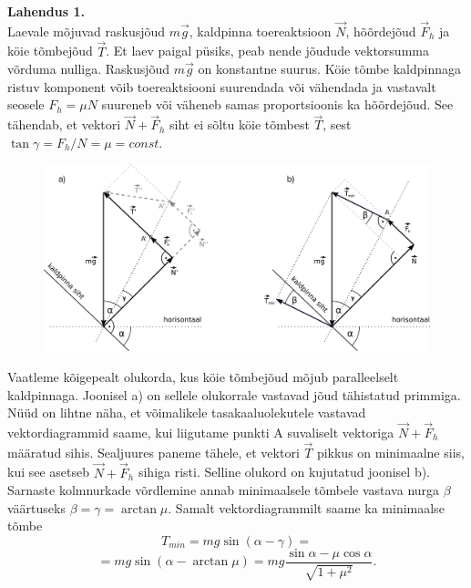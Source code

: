 \documentclass[10pt]{article}
\begin{document}

\solu
\textbf{Lahendus 1.} \\
Laevale mõjuvad raskusjõud $m\overrightarrow{g}$, kaldpinna toereaktsioon $\overrightarrow{N}$, hõõrdejõud $\overrightarrow{F}_h$ ja köie tõmbejõud $\overrightarrow{T}$. Et laev paigal püsiks, peab nende jõudude vektorsumma võrduma nulliga. Raskusjõud $m\overrightarrow{g}$ on konstantne suurus. Köie tõmbe kaldpinnaga ristuv komponent võib toereaktsiooni suurendada või vähendada ja vastavalt seosele $F_h=\mu N$ suureneb või väheneb samas proportsioonis ka hõõrdejõud. See tähendab, et vektori $\overrightarrow{N}+\overrightarrow{F}_h$ siht ei sõltu köie tõmbest $\overrightarrow{T}$, sest $\tan\gamma=F_h/N=\mu=\textit{const}$.

\begin{figure}[h]
\vspace{-0.0cm}
  \begin{center}
    \includegraphics[width=0.9\linewidth]{2021-v2g-10-yl1.pdf}
  \end{center}
  \vspace{-0.5cm}
\end{figure}

Vaatleme kõigepealt olukorda, kus köie tõmbejõud mõjub paralleelselt kaldpinnaga. Joonisel a) on sellele olukorrale vastavad jõud tähistatud primmiga. Nüüd on lihtne näha, et võimalikele tasakaaluolekutele vastavad vektordiagrammid saame, kui liigutame punkti A suvaliselt vektoriga $\overrightarrow{N}+\overrightarrow{F}_h$ määratud sihis. Sealjuures paneme tähele, et vektori $\overrightarrow{T}$ pikkus on minimaalne siis, kui see asetseb $\overrightarrow{N}+\overrightarrow{F}_h$ sihiga risti. Selline olukord on kujutatud joonisel b). Sarnaste kolmnurkade võrdlemine annab minimaalsele tõmbele vastava nurga $\beta$ väärtuseks $\beta=\gamma=\arctan\mu$. Samalt vektordiagrammilt saame ka minimaalse tõmbe
\[T_{min}=mg\sin(\alpha-\gamma)=\]
\[=mg\sin(\alpha-\arctan\mu)= mg\frac{\sin\alpha-\mu\cos\alpha}{\sqrt{1+\mu^2}}.\]
\end{document}
